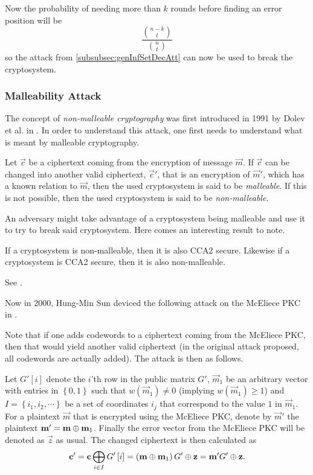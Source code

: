 Now the probability of needing more than $k$ rounds before finding an error position will be
\[
	\frac{\binom{n-k}{t}}{\binom{n}{t}}
\]
so the attack from \cref{subsubsec:genInfSetDecAtt} can now be used to break the cryptosystem.



\subsubsection{Malleability Attack}
\label{subsubsec:malAtt}

The concept of \emph{non-malleable cryptography} was first introduced in 1991 by Dolev et al. in \cite{DDN}. In order to understand this attack, one first needs to understand what is meant by malleable cryptography.
\begin{defi}
\label{def:malNonmalCry}
	Let $\vec{c}$ be a ciphertext coming from the encryption of message $\vec{m}$. If $\vec{c}$ can be changed into another valid ciphertext, $\vec{c}'$, that is an encryption of $\vec{m}'$, which has a known relation to $\vec{m}$, then the used cryptosystem is said to be \emph{malleable}. If this is not possible, then the used cryptosystem is said to be \emph{non-malleable}.
\end{defi}

An adversary might take advantage of a cryptosystem being malleable and use it to try to break said cryptosystem. Here comes an interesting result to note.
\begin{thm}
\label{thm:equiOfNMandCCA2}
	If a cryptosystem is non-malleable, then it is also CCA2 secure. Likewise if a cryptosystem is CCA2 secure, then it is also non-malleable.
	\begin{Proof}
		See \cite{BDPR}.
	\end{Proof}
\end{thm}


Now in 2000, Hung-Min Sun deviced the following attack on the McEliece PKC in \cite{sun}.

Note that if one adds codewords to a ciphertext coming from the McEliece PKC, then that would yield another valid ciphertext (in the original attack proposed, all codewords are actually added). The attack is then as follows.

Let $G'\left[i\right]$ denote the $i$'th row in the public matrix $G'$, $\vec{m}_1$ be an arbitrary vector with entries in $\left\{ 0,1 \right\}$ such that $w\left(\vec{m}_1\right) \neq 0$ (implying $w\left(\vec{m}_1\right) \geq 1$) and $I = \left\{ i_1, i_2, \cdots \right\}$  be a set of coordinates $i_j$ that correspond to the value $1$ in $\vec{m}_1$. For a plaintext $\vec{m}$ that is encrypted using the McEliece PKC, denote by $\vec{m}'$ the plaintext $\boldsymbol{\mathrm{m}}' = \boldsymbol{\mathrm{m}} \mathbin{\oplus} \boldsymbol{\mathrm{m}}_1$. Finally the error vector from the McEliece PKC will be denoted as $\vec{z}$ as usual. The changed ciphertext is then calculated as
\[
	\boldsymbol{\mathrm{c}}' = \boldsymbol{\mathrm{c}} \mathop{\mathbin{\bigoplus}}\limits_{i \in I} G'\left[i\right] = \left(\boldsymbol{\mathrm{m}} \mathbin{\oplus} \boldsymbol{\mathrm{m}}_1\right) G' \mathbin{\oplus} \boldsymbol{\mathrm{z}} = \boldsymbol{\mathrm{m}}' G' \mathbin{\oplus} \boldsymbol{\mathrm{z}}.
\]

